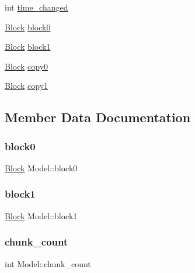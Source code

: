 \begin{DoxyCompactItemize}
\item 
int \hyperlink{structModel_aa4050c23342bfe2f344466b2e99dd3cb}{time\+\_\+changed}
\item 
\hyperlink{structBlock}{Block} \hyperlink{structModel_afddf699a972eb1144e4e2b6165e6c825}{block0}
\item 
\hyperlink{structBlock}{Block} \hyperlink{structModel_a375b22a0a3043bc685947b33d83bcc17}{block1}
\item 
\hyperlink{structBlock}{Block} \hyperlink{structModel_a3ddb16326999cefcf195fdd796d411a4}{copy0}
\item 
\hyperlink{structBlock}{Block} \hyperlink{structModel_a80358faa79d27e0e905f6542044458c5}{copy1}
\end{DoxyCompactItemize}


\subsection{Member Data Documentation}
\mbox{\label{structModel_afddf699a972eb1144e4e2b6165e6c825}} 
\subsubsection{\texorpdfstring{block0}{block0}}
{\footnotesize\ttfamily \hyperlink{structBlock}{Block} Model\+::block0}

\mbox{\label{structModel_a375b22a0a3043bc685947b33d83bcc17}} 
\subsubsection{\texorpdfstring{block1}{block1}}
{\footnotesize\ttfamily \hyperlink{structBlock}{Block} Model\+::block1}

\mbox{\label{structModel_ac890daa53d9fca686f850c61707534d3}} 
\subsubsection{\texorpdfstring{chunk\+\_\+count}{chunk\_count}}
{\footnotesize\ttfamily int Model\+::chunk\+\_\+count}

